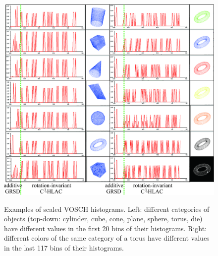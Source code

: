 \documentclass[a4paper, 10 pt, conference]{sty/ieeeconf}
\begin{document}
\begin{figure}[tb!]
  \begin{center}
    \includegraphics[width=.99\columnwidth]{figures/colorCHLAC/artificial/normalized_hist.jpg}
    \caption{Examples of scaled VOSCH histograms.
Left: different categories of objects (top-down: cylinder, cube, cone, plane, sphere, torus, die) 
have different values in the first 20 bins of their histograms.
Right: different colors of the same category of a torus have different values in the last 117 bins of their histograms.}
\vspace{-3ex}
    \label{fig:grsd_cchlac}
  \end{center}
\end{figure}

\end{document}
